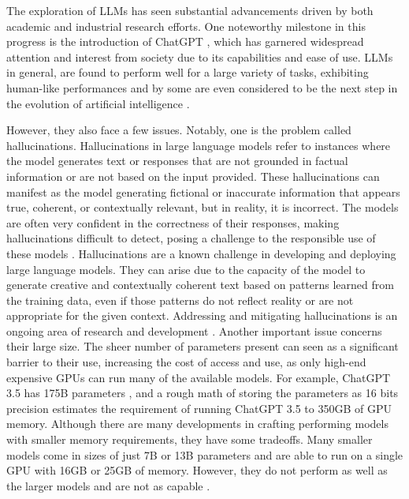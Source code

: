 The exploration of LLMs has seen substantial advancements driven by both academic and industrial research efforts. One noteworthy milestone in this progress is the introduction of ChatGPT \cite{chatgpt}, which has garnered widespread attention and interest from society due to its capabilities and ease of use. LLMs in general, are found to perform well for a large variety of tasks, exhibiting human-like performances and by some are even considered to be the next step in the evolution of artificial intelligence \cite{bubeck2023sparks}.  

However, they also face a few issues. Notably, one is the problem called hallucinations. Hallucinations in large language models refer to instances where the model generates text or responses that are not grounded in factual information or are not based on the input provided. These hallucinations can manifest as the model generating fictional or inaccurate information that appears true, coherent, or contextually relevant, but in reality, it is incorrect. The models are often very confident in the correctness of their responses, making hallucinations difficult to detect, posing a challenge to the responsible use of these models \cite{alkaissi2023artificial,azamfirei2023large}. Hallucinations are a known challenge in developing and deploying large language models. They can arise due to the capacity of the model to generate creative and contextually coherent text based on patterns learned from the training data, even if those patterns do not reflect reality or are not appropriate for the given context. Addressing and mitigating hallucinations is an ongoing area of research and development \cite{gunjal2023detecting,mundler2023self,peng2023check}. Another important issue concerns their large size. The sheer number of parameters present can seen as a significant barrier to their use, increasing the cost of access and use, as only high-end expensive GPUs can run many of the available models. For example, ChatGPT 3.5 has 175B parameters \cite{chatgpt-parameters}, and a rough math of storing the parameters as 16 bits precision estimates the requirement of running ChatGPT 3.5 to 350GB of GPU memory. Although there are many developments in crafting performing models with smaller memory requirements, they have some tradeoffs. Many smaller models come in sizes of just 7B or 13B parameters and are able to run on a single GPU with 16GB or 25GB of memory. However, they do not perform as well as the larger models and are not as capable \cite{touvronllama,falcon40b,mpt7b,wizard-vicuna}. 

